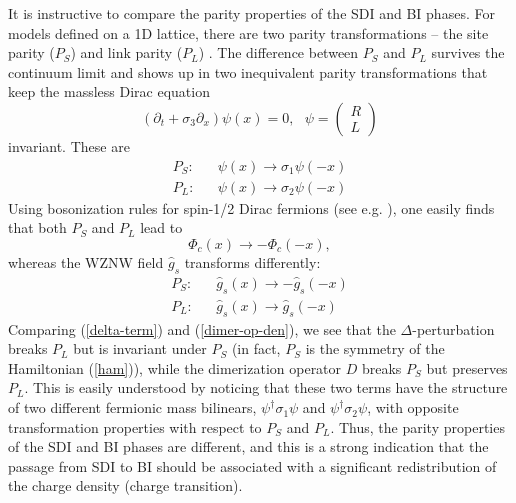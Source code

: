 It is instructive to compare the parity properties of the SDI and BI phases.
For models defined on a 1D lattice, there are two parity transformations --
the site parity ($P_S$) and link parity ($P_L$) \cite{EA}. The difference
between $P_S$ and $P_L$ survives the continuum limit and shows up in
two inequivalent parity transformations that keep the massless Dirac equation
$$
\left(\partial_t + \sigma_3 \partial_x \right) \psi (x) = 0, ~~~ \psi
= \left(
\begin{array}{clcr}
R\\
L
\end{array}
\right)
$$
invariant. These are
\begin{eqnarray}
P_S: && \psi (x) \rightarrow \sigma_1 \psi (-x) \label{P-S}\\
P_L: && \psi (x) \rightarrow \sigma_2 \psi (-x) \label{P-L}
\end{eqnarray}
Using bosonization rules for spin-1/2 Dirac fermions (see e.g. \cite{GNT}),
one easily finds that both $P_S$ and $P_L$ lead to
$$
\Phi_c (x) \rightarrow - \Phi_c (-x),
$$
whereas the WZNW field $\hat{g}_s$ transforms differently:
\begin{eqnarray}
P_S: && \hat{g}_s (x) \rightarrow - \hat{g}_s (- x) \label{g-PS}\\
P_L: && \hat{g}_s (x) \rightarrow \hat{g}_s (- x)\label{g-PL}
\end{eqnarray}
Comparing (\ref{delta-term}) and (\ref{dimer-op-den}), we see that
the $\Delta$-perturbation breaks $P_L$ but is invariant under $P_S$
(in fact, $P_S$ is the symmetry of the Hamiltonian (\ref{ham})), while
the dimerization operator $D$ breaks $P_S$ but preserves $P_L$.
This is easily understood by noticing that these two terms have the structure
of two different fermionic mass bilinears,
$ \psi^{\dagger} \sigma_1 \psi$ and $ \psi^{\dagger} \sigma_2 \psi$,
with opposite transformation properties with respect to $P_S$ and $P_L$.
Thus, the parity properties of the SDI and BI phases are different,
and this is a strong indication that the passage from SDI to BI should
be associated with a significant redistribution of the charge density
(charge transition).

